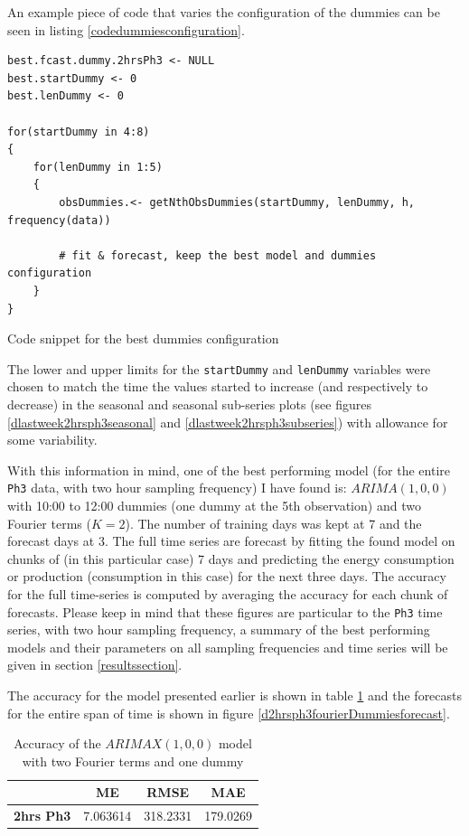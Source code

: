 \documentclass[12pt,a4paper,titlepage]{report}
\begin{document}
An example piece of code that varies the configuration of the dummies can be seen in listing \ref{codedummiesconfiguration}.

\begin{listing}[h]
    \begin{verbatim}
best.fcast.dummy.2hrsPh3 <- NULL
best.startDummy <- 0
best.lenDummy <- 0
    
for(startDummy in 4:8)
{
    for(lenDummy in 1:5)
    {
        obsDummies.<- getNthObsDummies(startDummy, lenDummy, h, frequency(data))
        
        # fit & forecast, keep the best model and dummies configuration
    }
}
\end{verbatim}

\caption{Code snippet for the best dummies configuration}
\label{codedummiesconfiguration}
\end{listing}

The lower and upper limits for the \texttt{startDummy} and \texttt{lenDummy} variables were chosen to match the time the values started to increase (and respectively to decrease) in the seasonal and seasonal sub-series plots (see figures \ref{dlastweek2hrsph3seasonal} and \ref{dlastweek2hrsph3subseries}) with allowance for some variability.

With this information in mind, one of the best performing model (for the entire \texttt{Ph3} data, with two hour sampling frequency) I have found is: $ ARIMA(1, 0, 0) $ with 10:00 to 12:00 dummies (one dummy at the 5th observation) and two Fourier terms ($ K = 2 $). The number of training days was kept at 7 and the forecast days at 3. The full time series are forecast by fitting the found model on chunks of (in this particular case) 7 days and predicting the energy consumption or production (consumption in this case) for the next three days. The accuracy for the full time-series is computed by averaging the accuracy for each chunk of forecasts. Please keep in mind that these figures are particular to the \texttt{Ph3} time series, with two hour sampling frequency, a summary of the best performing models and their parameters on all sampling frequencies and time series will be given in section \ref{resultssection}.

The accuracy for the model presented earlier is shown in table \ref{accuracyoffull2hrsph3} and the forecasts for the entire span of time is shown in figure \ref{d2hrsph3fourierDummiesforecast}.

\begin{table}[h]
    \begin{tabular}{|c|c|c|c|}
        \hline
        & \textbf{ME} & \textbf{RMSE} & \textbf{MAE}\\
        \hline
        \textbf{2hrs Ph3} & 7.063614 &	318.2331 &	179.0269 \\
        \hline
    \end{tabular}
    \centering
    \caption{Accuracy of the $ ARIMAX(1, 0, 0) $ model with two Fourier terms and one dummy}
    \label{accuracyoffull2hrsph3}
\end{table}
    
\end{document}

